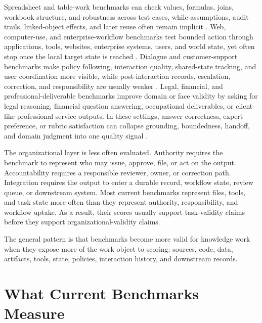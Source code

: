 \documentclass{article}
\begin{document}
Spreadsheet and table-work benchmarks can check values, formulas, joins, workbook structure, and robustness across test cases, while assumptions, audit trails, linked-object effects, and later reuse often remain implicit \citep{ma2024spreadsheetbench}.
Web, computer-use, and enterprise-workflow benchmarks test bounded action through applications, tools, websites, enterprise systems, users, and world state, yet often stop once the local target state is reached \citep{zhou2023webarena,drouin2024workarena,boisvert2024workarenaplus,xie2024osworld}.
Dialogue and customer-support benchmarks make policy following, interaction quality, shared-state tracking, and user coordination more visible, while post-interaction records, escalation, correction, and responsibility are usually weaker \citep{barres2025tau2}.
Legal, financial, and professional-deliverable benchmarks improve domain or face validity by asking for legal reasoning, financial question answering, occupational deliverables, or client-like professional-service outputs.
In these settings, answer correctness, expert preference, or rubric satisfaction can collapse grounding, boundedness, handoff, and domain judgment into one quality signal \citep{guha2023legalbench,islam2023financebench,gdpval2025,vidgen2026apexagents}.

The organizational layer is less often evaluated.
Authority requires the benchmark to represent who may issue, approve, file, or act on the output.
Accountability requires a responsible reviewer, owner, or correction path.
Integration requires the output to enter a durable record, workflow state, review queue, or downstream system.
Most current benchmarks represent files, tools, and task state more often than they represent authority, responsibility, and workflow uptake.
As a result, their scores usually support task-validity claims before they support organizational-validity claims.

The general pattern is that benchmarks become more valid for knowledge work when they expose more of the work object to scoring: sources, code, data, artifacts, tools, state, policies, interaction history, and downstream records.


\section{What Current Benchmarks Measure}
\label{sec:whybench}
\end{document}
